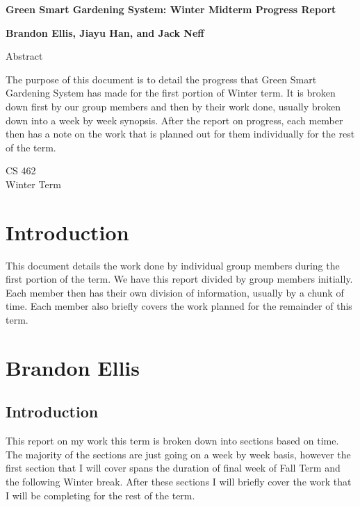 \documentclass[IEEEtran,letterpaper,10pt,titlepage,fleqn,draftclsnofoot,onecolumn]{article}
\begin{document}
\begin{titlepage}
  \begin{center}
    \vspace{1cm}
    
    \huge
    \textbf{Green Smart Gardening System: Winter Midterm Progress Report}
    
    \vspace{1.5cm}
    
    \large
        \textbf{Brandon Ellis, Jiayu Han, and Jack Neff}
    
    \vspace{5cm}
    
    Abstract
    
    \normalsize
    The purpose of this document is to detail the progress that Green Smart Gardening System has made for the first portion of Winter term. It is broken down first by our group members and then by their work done, usually broken down into a week by week synopsis. After the report on progress, each member then has a note on the work that is planned out for them individually for the rest of the term.
    
    \vfill
    
    \large
        CS 462\\
        Winter Term\\
    \end{center}
\end{titlepage}

\section{Introduction}

This document details the work done by individual group members during the first portion of the term. We have this report divided by group members initially. Each member then has their own division of information, usually by a chunk of time. Each member also briefly covers the work planned for the remainder of this term.

\section{Brandon Ellis}

\subsection{Introduction}

This report on my work this term is broken down into sections based on time. The majority of the sections are just going on a week by week basis, however the first section that I will cover spans the duration of final week of Fall Term and the following Winter break. After these sections I will briefly cover the work that I will be completing for the rest of the term.
\end{document}
